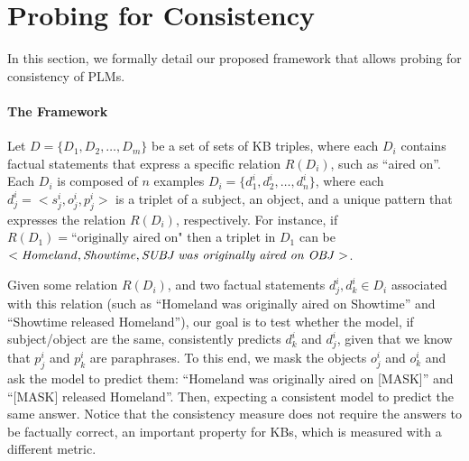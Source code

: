 \section{Probing for Consistency}
\label{sec:framework}

In this section, we formally detail our proposed framework that allows probing for consistency of PLMs.



\paragraph{The Framework}
Let
$D = \{D_1, D_2,
\dots, D_m\}$
be a set of sets of KB triples,
where each $D_i$ contains factual statements
that express a specific relation $R(D_i)$, such as ``aired
on''. Each $D_i$ is composed of $n$ examples $D_i = \{d_1^i,
d_2^i, \dots, d_n^i\}$, where each $d_j^i = <s_j^i, o_j^i,
p_j^i>$ is a triplet of a subject, an object, and a unique
pattern that expresses the relation $R(D_i)$,
respectively. For instance, if $R(D_1)=\text{``originally
  aired on"}$ then a triplet in $D_1$ can be $<
\text{\textit{Homeland}}, \text{\textit{Showtime}},
\text{\textit{SUBJ{} was originally aired on OBJ{}}}>$.



Given some relation $R(D_i)$, and two factual statements
$d_j^i,d_k^i \in D_i$
associated with this relation 
(such as
``Homeland was originally aired on Showtime'' and ``Showtime
released Homeland''), our goal is to test whether the model,
if subject/object are the same,
consistently predicts $d_k^i$ and $d_j^i$, given that we
know that $p_j^i$ and $p_k^i$ are paraphrases.  To this end,
we mask the objects $o_j^i$ and $o_k^i$ and ask the model to
predict them: ``Homeland was originally aired on [MASK]''
and ``[MASK] released Homeland''.  Then, expecting a
consistent model to predict the same answer.  Notice that
the consistency measure does not require the answers to be
factually correct, an important property for KBs, which is
measured with a different metric.


